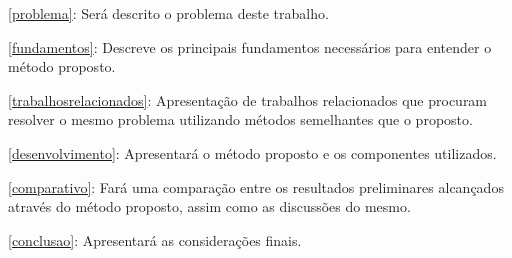 \autoref{problema}: Será descrito o problema deste trabalho.

\autoref{fundamentos}: Descreve os principais fundamentos necessários para entender o método proposto.

\autoref{trabalhosrelacionados}: Apresentação de trabalhos relacionados que procuram resolver o mesmo problema utilizando métodos semelhantes que o proposto.

\autoref{desenvolvimento}: Apresentará o método proposto e os componentes utilizados.

\autoref{comparativo}: Fará uma comparação entre os resultados preliminares alcançados através do método proposto, assim como as discussões do mesmo.

\autoref{conclusao}: Apresentará as considerações finais.

